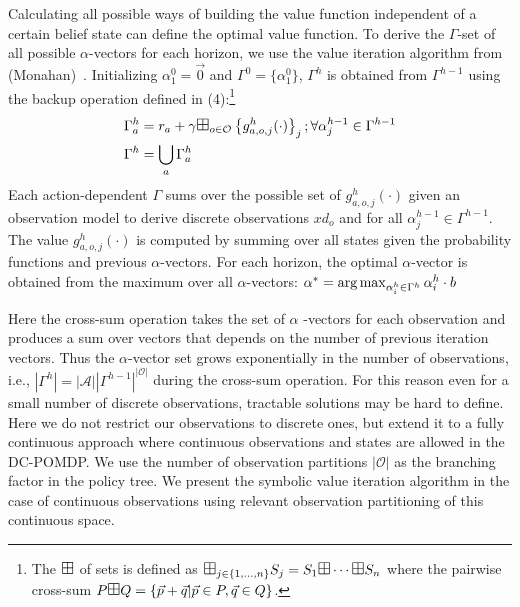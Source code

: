 \documentclass{article} %
\def\argmax{\operatornamewithlimits{arg\max}}
\begin{document}
Calculating all possible ways of building the value function independent of a certain belief state can define the optimal value function. To derive the $\Gamma$-set of all possible $\alpha$-vectors for each horizon, we use the value iteration algorithm from (Monahan)~\cite{monahan82}. 
Initializing  $\alpha^0_1 = \vec{0}$ and $\Gamma^0 = \{ \alpha^0_1 \}$, $\Gamma^h$ is obtained from $\Gamma^{h-1}$ using the backup operation defined in (4):\footnote{The $\textrm{\large $\boxplus$}$ of sets is defined as 
$\textrm{\large $\boxplus$}_{j \in \{ 1,\ldots, n \} } S_j = S_1 \textrm{\large $\boxplus$} \cdots \textrm{\large $\boxplus$} S_n$ where the pairwise cross-sum $P 
\textrm{\large $\boxplus$} Q = \{ \vec{p} + \vec{q} | \vec{p} \in P, \vec{q} \in Q \}$.}
\begin{align}
\Gamma^{h}_a   &= r_a + \gamma \textrm{\large $\boxplus$}_{o \in \mathcal{O}} \left\{ g^h_{a,o,j}(\cdot) \right\}_j ;  \forall \alpha^{h-1}_{j} \in \Gamma^{h-1}  \\
\Gamma^h  &= \bigcup_a \Gamma^h_a 
\end{align}
Each action-dependent $\Gamma$ sums over the possible set of $g^h_{a,o,j}(\cdot)$ given an observation model to derive discrete observations $xd_o$ and for all $\alpha^{h-1}_{j} \in \Gamma^{h-1} $. The value $g^h_{a,o,j}(\cdot)$ is computed by summing over all states given the probability functions and previous $\alpha$-vectors.  
For each horizon, the optimal $\alpha$-vector is obtained from the maximum over all $\alpha$-vectors: 
$\alpha^* = \argmax_{\alpha^h_i \in \Gamma^h} \alpha^h_i \cdot b $

Here the cross-sum operation takes the set of $\alpha$ -vectors for each observation and produces a sum over vectors that depends on the number of previous iteration vectors. Thus the $\alpha$-vector set grows exponentially in the number of observations, i.e., $|\Gamma^{h}| = |\mathcal{A}||\Gamma^{h-1}|^{|\mathcal{O}|}$ during the cross-sum operation. For this reason even for a small number of discrete observations, tractable solutions may be hard to define. Here we do not restrict our observations to discrete ones, but extend it to a fully continuous approach where continuous observations and states are allowed in the DC-POMDP. We use the number of  observation partitions $|\mathcal{O}|$ as the branching factor in the policy tree. We present the symbolic value iteration algorithm in the case of continuous observations using relevant observation partitioning of this continuous space. 
\end{document}
